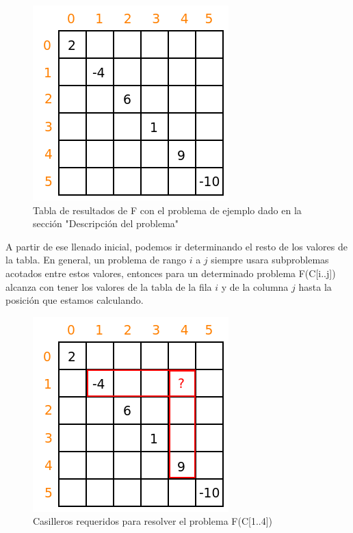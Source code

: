 \begin{figure}[h]
\begin{center}
\includegraphics[scale=0.6]{./img/ej1_res2.png}
\caption{Tabla de resultados de F con el problema de ejemplo dado en la secci\'on "Descripci\'on del problema"}
\end{center}
\end{figure}

A partir de ese llenado inicial, podemos ir determinando el resto de los valores de la tabla. En general, un problema de rango $i$ a $j$ siempre usara subproblemas acotados entre estos valores, entonces para un determinado problema F(C[i..j]) alcanza con tener los valores de la tabla de la fila $i$ y de la columna $j$ hasta la posici\'on que estamos calculando.

\newpage

\begin{figure}[h]
\begin{center}
\includegraphics[scale=0.6]{./img/ej1_res3.png}
\caption{Casilleros requeridos para resolver el problema F(C[1..4])}
\end{center}
\end{figure}

